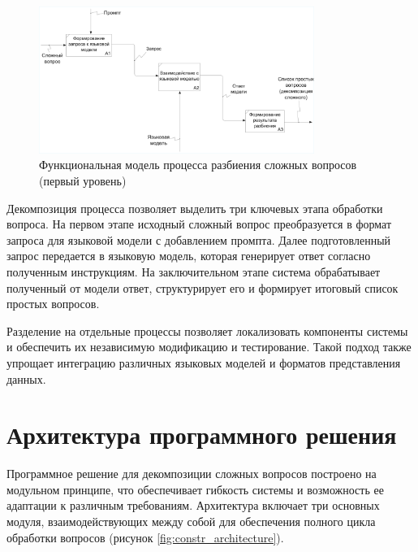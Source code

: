 \begin{figure}[h]
	\centering
	\includegraphics[width=0.8\textwidth]{images/idef0_level1.pdf}
	\caption{Функциональная модель процесса разбиения сложных вопросов (первый уровень)}
	\label{fig:constr_idef0_level1}
\end{figure}

Декомпозиция процесса позволяет выделить три ключевых этапа обработки вопроса. На первом этапе исходный сложный вопрос преобразуется в формат запроса для языковой модели с добавлением промпта. Далее подготовленный запрос передается в языковую модель, которая генерирует ответ согласно полученным инструкциям. На заключительном этапе система обрабатывает полученный от модели ответ, структурирует его и формирует итоговый список простых вопросов.

Разделение на отдельные процессы позволяет локализовать компоненты системы и обеспечить их независимую модификацию и тестирование. Такой подход также упрощает интеграцию различных языковых моделей и форматов представления данных.

\section{Архитектура программного решения}

Программное решение для декомпозиции сложных вопросов построено на модульном принципе, что обеспечивает гибкость системы и возможность ее адаптации к различным требованиям. Архитектура включает три основных модуля, взаимодействующих между собой для обеспечения полного цикла обработки вопросов (рисунок \ref{fig:constr_architecture}).

